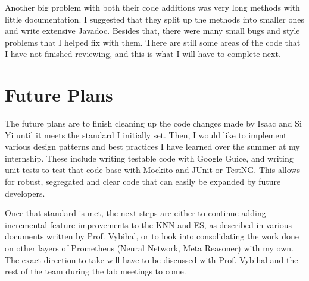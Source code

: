 \documentclass[]{article}
\begin{document}
	Another big problem with both their code additions was very long methods with little documentation. I suggested that they split up the methods into smaller ones and write extensive Javadoc. Besides that, there were many small bugs and style problems that I helped fix with them. There are still some areas of the code that I have not finished reviewing, and this is what I will have to complete next.
	
	\section{Future Plans}
	
	The future plans are to finish cleaning up the code changes made by Isaac and Si Yi until it meets the standard I initially set. Then, I would like to implement various design patterns and best practices I have learned over the summer at my internship. These include writing testable code with Google Guice, and writing unit tests to test that code base with Mockito and JUnit or TestNG. This allows for robust, segregated and clear code that can easily be expanded by future developers.
	
	Once that standard is met, the next steps are either to continue adding incremental feature improvements to the KNN and ES, as described in various documents written by Prof. Vybihal, or to look into consolidating the work done on other layers of Prometheus (Neural Network, Meta Reasoner) with my own. The exact direction to take will have to be discussed with Prof. Vybihal and the rest of the team during the lab meetings to come.
	
	
	{}
	
\end{document}
